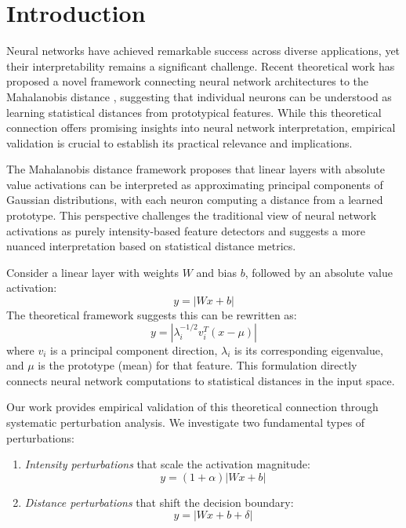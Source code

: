 \section{Introduction}

Neural networks have achieved remarkable success across diverse applications, yet their interpretability remains a significant challenge. Recent theoretical work has proposed a novel framework connecting neural network architectures to the Mahalanobis distance \citep{oursland2024interpreting}, suggesting that individual neurons can be understood as learning statistical distances from prototypical features. While this theoretical connection offers promising insights into neural network interpretation, empirical validation is crucial to establish its practical relevance and implications.

The Mahalanobis distance framework proposes that linear layers with absolute value activations can be interpreted as approximating principal components of Gaussian distributions, with each neuron computing a distance from a learned prototype. This perspective challenges the traditional view of neural network activations as purely intensity-based feature detectors and suggests a more nuanced interpretation based on statistical distance metrics.

Consider a linear layer with weights $W$ and bias $b$, followed by an absolute value activation:
\begin{equation}
    y = |Wx + b|
\end{equation}
The theoretical framework suggests this can be rewritten as:
\begin{equation}
    y = |\lambda^{-1/2}_i v^T_i(x - \mu)|
\end{equation}
where $v_i$ is a principal component direction, $\lambda_i$ is its corresponding eigenvalue, and $\mu$ is the prototype (mean) for that feature. This formulation directly connects neural network computations to statistical distances in the input space.

Our work provides empirical validation of this theoretical connection through systematic perturbation analysis. We investigate two fundamental types of perturbations:
\begin{enumerate}
    \item \textit{Intensity perturbations} that scale the activation magnitude:
        \begin{equation}
            y = (1 + \alpha)|Wx + b|
        \end{equation}
    \item \textit{Distance perturbations} that shift the decision boundary:
        \begin{equation}
            y = |Wx + b + \delta|
        \end{equation}
\end{enumerate}


